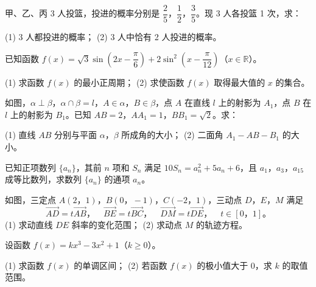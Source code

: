 \begin{question}
甲、乙、丙 3 人投篮，投进的概率分别是 $\dfrac25\text{，}\dfrac12\text{，}\dfrac35$。现 3 人各投篮 1 次，求：

(1) 3 人都投进的概率；
(2) 3 人中恰有 2 人投进的概率。

\end{question}
\begin{question}
已知函数 \(f(x)=\sqrt3\sin\left(2x-\dfrac\pi6\right)+2\sin^2\left(x-\dfrac\pi{12}\right)\)（\(x\in\mathbb R\)）。

(1) 求函数 \(f(x)\) 的最小正周期；
(2) 求使函数 \(f(x)\) 取得最大值的 \(x\) 的集合。

\Needspace{0.4\textheight}
\end{question}
\begin{question}
如图，$\alpha\perp\beta\text{，}\alpha\cap\beta=l\text{，}A\in\alpha\text{，}B\in\beta$，点 \(A\) 在直线 \(l\) 上的射影为 \(A_1\)，点 \(B\) 在 \(l\) 上的射影为 \(B_1\)。已知 $AB=2\text{，}AA_1=1\text{，}BB_1=\sqrt2$。求：

(1) 直线 \(AB\) 分别与平面 $\alpha\text{，}\beta$ 所成角的大小；
(2) 二面角 \(A_1-AB-B_1\) 的大小。
\nopagebreak[4]
\begin{center}\end{center}
\nopagebreak[4]
\end{question}
\begin{question}
已知正项数列 \(\{a_n\}\)，其前 \(n\) 项和 \(S_n\) 满足 \(10S_n=a_n^2+5a_n+6\)，且 $a_1\text{，}a_3\text{，}a_{15}$ 成等比数列，求数列 \(\{a_n\}\) 的通项 \(a_n\)。

\Needspace{0.4\textheight}
\end{question}
\begin{question}
如图，三定点 $A(2\text{，}1)\text{，}B(0\text{，}-1)\text{，}C(-2\text{，}1)$，三动点 $D\text{，}E\text{，}M$ 满足
\nopagebreak[4]
\[
\overrightarrow{AD}=t\overrightarrow{AB}\text{，}\quad \overrightarrow{BE}=t\overrightarrow{BC}\text{，}\quad \overrightarrow{DM}=t\overrightarrow{DE}\text{，}\quad t\in[0\text{，}1]\mbox{。}
\]
(1) 求动直线 \(DE\) 斜率的变化范围；
(2) 求动点 \(M\) 的轨迹方程。
\nopagebreak[4]
\begin{center}\end{center}
\nopagebreak[4]
\end{question}
\begin{question}
设函数 \(f(x)=kx^3-3x^2+1\)（\(k\ge0\)）。

(1) 求函数 \(f(x)\) 的单调区间；
(2) 若函数 \(f(x)\) 的极小值大于 0，求 \(k\) 的取值范围。

\end{question}
